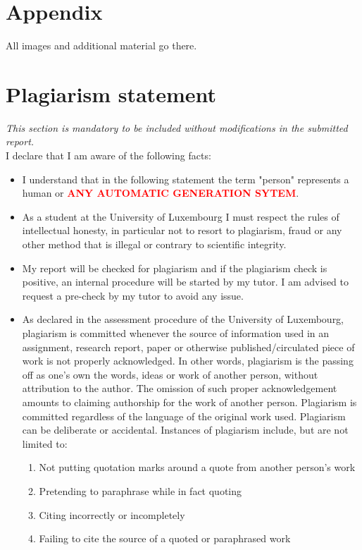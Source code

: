 \documentclass[conference,compsoc]{IEEEtran}
\begin{document}
\cleardoublepage
\section*{Appendix}
All images and additional material go there.



\section*{Plagiarism statement}
{\it This section is mandatory to be included without modifications in the submitted report.}\\

I declare that I am aware of the following facts:
\begin{itemize}
    \item I understand that in the following statement the term "person" represents a human or \textbf{\textcolor{red}{ANY AUTOMATIC GENERATION SYTEM}}.
	\item As a student at the University of Luxembourg I must respect the rules of intellectual honesty, in particular not to resort to plagiarism, fraud or any other method that is illegal or contrary to scientific integrity.
	\item My report will be checked for plagiarism and if the plagiarism check is positive, an internal procedure will be started by my tutor. I am advised to request a pre-check by my tutor to avoid any issue.
	\item As declared in the assessment procedure of the University of Luxembourg, plagiarism is committed whenever the source of information used in an assignment, research report, paper or otherwise published/circulated piece of work is not properly acknowledged. In other words, plagiarism is the passing off as one’s own the words, ideas or work of another person, without attribution to the author. The omission of such proper acknowledgement amounts to claiming authorship for the work of another person. Plagiarism is committed regardless of the language of the original work used. Plagiarism can be deliberate or accidental.
Instances of plagiarism include, but are not limited to:
\begin{enumerate}
  \item Not putting quotation marks around a quote from another person’s work
  \item Pretending to paraphrase while in fact quoting
  \item Citing incorrectly or incompletely
  \item Failing to cite the source of a quoted or paraphrased work

\end{enumerate}
\end{itemize}
\end{document}
